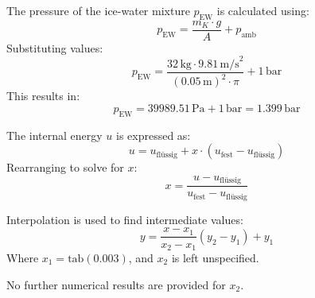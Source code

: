 The pressure of the ice-water mixture \( p_{\text{EW}} \) is calculated using:  
\[
p_{\text{EW}} = \frac{m_K \cdot g}{A} + p_{\text{amb}}
\]  
Substituting values:  
\[
p_{\text{EW}} = \frac{32 \, \text{kg} \cdot 9.81 \, \text{m/s}^2}{(0.05 \, \text{m})^2 \cdot \pi} + 1 \, \text{bar}
\]  
This results in:  
\[
p_{\text{EW}} = 39989.51 \, \text{Pa} + 1 \, \text{bar} = 1.399 \, \text{bar}
\]  

The internal energy \( u \) is expressed as:  
\[
u = u_{\text{flüssig}} + x \cdot (u_{\text{fest}} - u_{\text{flüssig}})
\]  
Rearranging to solve for \( x \):  
\[
x = \frac{u - u_{\text{flüssig}}}{u_{\text{fest}} - u_{\text{flüssig}}}
\]  

Interpolation is used to find intermediate values:  
\[
y = \frac{x - x_1}{x_2 - x_1} (y_2 - y_1) + y_1
\]  
Where \( x_1 = \text{tab}(0.003) \), and \( x_2 \) is left unspecified.  

No further numerical results are provided for \( x_2 \).